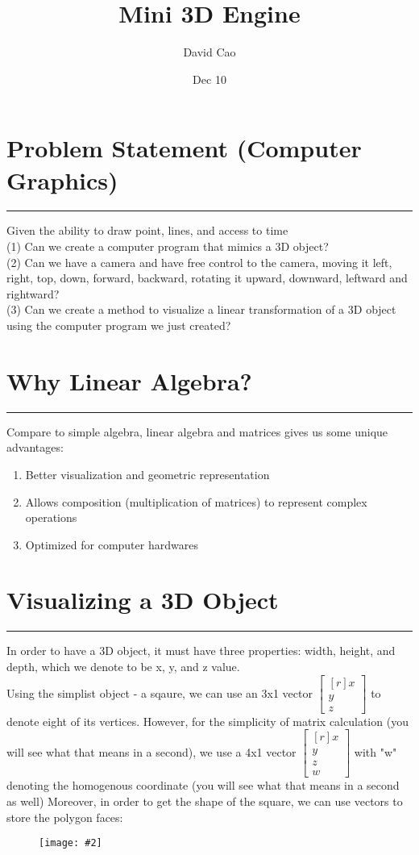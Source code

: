 \documentclass[11pt]{article}
\title{Mini 3D Engine}
\author{David Cao}
\date{Dec 10}
\newcommand{\cimage}[3]{
    \begin{figure}[!ht]
        \centering
        \texttt{[image: \#2]}
        \caption{#3}
        \label{fig:enter-label}
    \end{figure}
}
\newcommand{\mysection}[1]{
    \section*{#1}
    \hrule
    \vspace*{0.5cm}
}
\newcommand{\mat}[1]{
    $\begin{bmatrix*}[r]
        #1
    \end{bmatrix*}$
} %
\newcommand{\gap}{\vspace*{0.5cm}}
\begin{document}
\maketitle

\mysection{Problem Statement (Computer Graphics)}
Given the ability to draw point, lines, and access to time \\
(1) Can we create a computer program that mimics a 3D object? \\
(2) Can we have a camera and have free control to the camera, moving it left, right, top, down, forward, backward, rotating it upward, downward, leftward and rightward? \\
(3) Can we create a method to visualize a linear transformation of a 3D object using the computer program we just created? 
\mysection{Why Linear Algebra?}
Compare to simple algebra, linear algebra and matrices gives us some unique advantages:
\begin{enumerate}
    \item Better visualization and geometric representation
    \item Allows composition (multiplication of matrices) to represent complex operations
    \item Optimized for computer hardwares
\end{enumerate}

\mysection{Visualizing a 3D Object}
In order to have a 3D object, it must have three properties: width, height, and depth, which we denote to be x, y, and z value. \gap \\
Using the simplist object - a sqaure, we can use an 3x1 vector \mat{x\\y\\z} to denote eight of its vertices. However, for the simplicity of matrix calculation (you will see what that means in a second), we use a 4x1 vector \mat{x\\y\\z\\w} with "w" denoting the homogenous coordinate (you will see what that means in a second as well) Moreover, in order to get the shape of the square, we can use vectors to store the polygon faces: \gap \\
\cimage{0.3}{cube}{}
\end{document}
